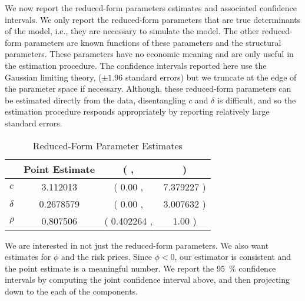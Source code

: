 \documentclass[11pt, letterpaper, twoside]{article}
\begin{document}
We now report the reduced-form parameters estimates and associated confidence intervals. We only report the reduced-form parameters that are true determinants of the model, i.e., they are necessary to simulate the model. The other reduced-form parameters are known functions of these parameters and the structural parameters. These parameters have no economic meaning and are only useful in the estimation procedure. The confidence intervals reported here use the Gaussian limiting theory, ($\pm 1.96$ standard errors) but we truncate at the edge of the parameter space if necessary. Although, these reduced-form parameters can be estimated directly from the data, disentangling $c$ and $\delta$ is difficult, and so the estimation procedure responds appropriately by reporting relatively large standard errors. 


\begin{table}[htb]
  \caption{Reduced-Form Parameter Estimates} 
  \label{tbl:reduced_form_parameters}

  \centering

  \begin{tabularx}{.5\textwidth}{X | S >{{(}} S[table-space-text-pre={(}] <{{,\,}}
    S[table-space-text-pre={\hspace{-1cm}}] <{{)}}}
%
    \toprule
    & {Point Estimate} &  \\
    \midrule
    $c$     & 3.112013 & 0.00 & 7.379227 \\
    $\delta$  & 0.2678579 & 0.00 & 3.007632 \\
    $\rho$   & 0.807506 & 0.402264 & 1.00 \\
    \bottomrule 
  \end{tabularx}
\end{table}


We are interested in not just the reduced-form parameters. We also want estimates for $\phi$ and the risk prices. Since $\phi < 0$, our estimator is consistent and the point estimate is a meaningful number. We report the \SI{95}{\percent} confidence intervals by computing the joint confidence interval above, and then projecting down to the each of the components.
\end{document}
